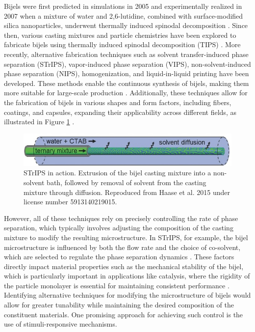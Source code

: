 Bijels were first predicted in simulations in 2005 and experimentally realized in 2007 when a mixture of water and 2,6-lutidine, combined with 
surface-modified silica nanoparticles, underwent thermally induced spinodal decomposition \cite{stratford_colloidal_2005, herzig_bicontinuous_2007}. 
Since then, various casting mixtures and particle chemistries have been explored to fabricate bijels using thermally induced spinodal decomposition (TIPS) 
\cite{lee_bicontinuous_2010, bai_dynamics_2015}. More recently, alternative fabrication techniques such as solvent transfer-induced phase separation (STrIPS), 
vapor-induced phase separation (VIPS), non-solvent-induced phase separation (NIPS), homogenization, and liquid-in-liquid printing have been developed. 
These methods enable the continuous synthesis of bijels, making them more suitable for large-scale production 
\cite{haase_continuous_2015, wang_scalable_2020, cai_bijels_2017, yabuno_preparation_2020, wang_bicontinuous_2023, amirfattahi_fabrication_2024}. 
Additionally, these techniques allow for the fabrication of bijels in various shapes and form factors, including fibers, coatings, and capsules, expanding 
their applicability across different fields, as illustrated in Figure \ref{fig:strips} 
\cite{haase_continuous_2015, boakye-ansah_controlling_2020, kharal_hightensile_2020, wang_bicontinuous_2023}.  

\begin{figure}[h]
    \centering
    \includegraphics[scale = 2]{figures/literature_review/STRIPPS.jpg}
    \caption{STrIPS in action. Extrusion of the bijel casting mixture into a non-solvent bath, followed by removal of solvent from 
    the casting mixture through diffusion. Reproduced from Haase et al. 2015 under license number 5913140219015. \cite{haase_continuous_2015}}
    \label{fig:strips}
\end{figure}

However, all of these techniques rely on precisely controlling the rate of phase separation, which typically involves adjusting the composition 
of the casting mixture to modify the resulting microstructure. In STrIPS, for example, the bijel microstructure is influenced by both the flow rate 
and the choice of co-solvent, which are selected to regulate the phase separation dynamics \cite{haase_continuous_2015}. These factors directly 
impact material properties such as the mechanical stability of the bijel, which is particularly important in applications like catalysis, where the 
rigidity of the particle monolayer is essential for maintaining consistent performance 
\cite{reeves_particle-size_2015, haase_situ_2016, boakye-ansah_controlling_2020}. Identifying alternative techniques for modifying the microstructure of 
bijels would allow for greater tunability while maintaining the desired composition of the constituent materials. One promising approach for achieving 
such control is the use of stimuli-responsive mechanisms.  

